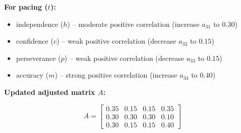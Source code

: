 \documentclass{article}
\begin{document}
        \textbf{For pacing ($t$):}
        \begin{itemize}
	        \item independence ($h$) – moderate positive correlation (increase $a_{31}$ to $0.30$)
	        \item confidence ($c$) – weak positive correlation (decrease $a_{32}$ to $0.15$)
	        \item perseverance ($p$) – weak positive correlation (decrease $a_{33}$ to $0.15$)
	        \item accuracy ($m$) – strong positive correlation (increase $a_{34}$ to $0.40$)
        \end{itemize}

        \textbf{Updated adjusted matrix $A$:}

        \[
            A = \begin{bmatrix} 
                0.35 & 0.15 & 0.15 & 0.35 \\
                0.30 & 0.30 & 0.30 & 0.10 \\
                0.30 & 0.15 & 0.15 & 0.40
            \end{bmatrix}
        \]
 
\end{document}
